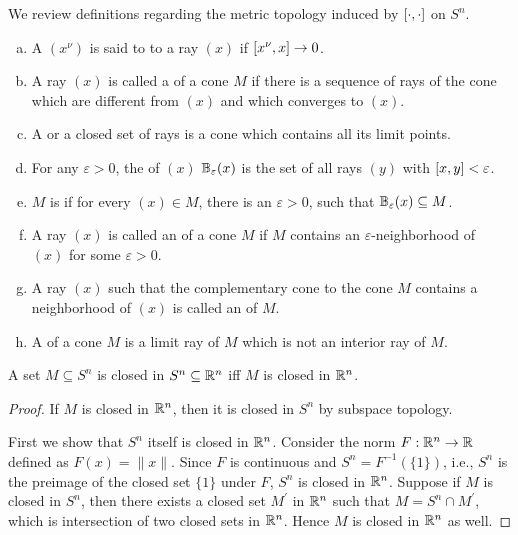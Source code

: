 \documentclass[11pt,a4paper]{article}
\begin{document}
\begin{definition}\label{def:cone_topology}
    We review definitions regarding the metric topology induced by $[\cdot, \cdot]$ on $S^n$.
    \begin{enumerate}[(a)]
        \item A  $(x^\nu)$ is said to  to a ray $(x)$ if $[x^\nu, x]\rightarrow 0$. 
        \item A ray $(x)$ is called a  of a cone $M$ if there is a sequence of rays of the cone which are different from $(x)$ and which converges to $(x)$. 
        \item A  or a closed set of rays is a cone which contains all its limit points. 
        \item For any $\varepsilon>0$, the  of $(x)$ $\mathbb{B}_\varepsilon(x)$ is the set of all rays $(y)$ with $[x, y] < \varepsilon$.
        \item $M$ is  if for every $(x)\in M$, there is an $\varepsilon>0$, such that $\mathbb{B}_\varepsilon(x)\subseteq M$.
        \item A ray $(x)$ is called an  of a cone $M$ if $M$ contains an $\varepsilon$-neighborhood of $(x)$ for some $\varepsilon>0$.
        \item A ray $(x)$ such that the complementary cone to the cone $M$ contains a neighborhood of $(x)$ is called an  of $M$.
        \item A  of a cone $M$ is a limit ray of $M$ which is not an interior ray of $M$.
    \end{enumerate}
\end{definition}

\begin{lemma}\label{lem:closed_sets_sphere}
    A set $M\subseteq S^n$ is closed in $S^n\subseteq \mathbb{R}^n$ iff $M$ is closed in $\mathbb{R}^n$.
\end{lemma}

\begin{proof}
    \converse If $M$ is closed in $\mathbb{R}^n$, then it is closed in $S^n$ by subspace topology. 
    
    \forward First we show that $S^n$ itself is closed in $\mathbb{R}^n$. Consider the norm $F:\mathbb{R}^n\rightarrow \mathbb{R}$ defined as $F(x) = \|x\|$. Since $F$ is continuous and $S^n = F^{-1}(\{1\})$, i.e., $S^n$ is the preimage of the closed set $\{1\}$ under $F$, $S^n$ is closed in $\mathbb{R}^n$. Suppose if $M$ is closed in $S^n$, then there exists a closed set $M^\prime$ in $\mathbb{R}^n$ such that $M = S^n \cap M^\prime$, which is intersection of two closed sets in $\mathbb{R}^n$. Hence $M$ is closed in $\mathbb{R}^n$ as well.
\end{proof}
\end{document}
